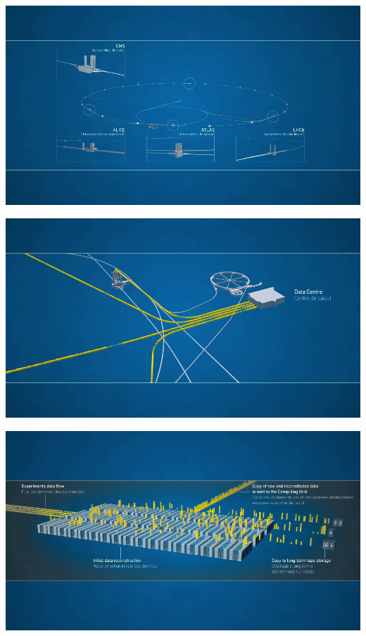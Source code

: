 \documentclass{beamer}
\begin{document}
\begin{frame}
    \includegraphics[width=\textwidth]{video/detectors.png}
\end{frame}

\begin{frame}
    \includegraphics[width=\textwidth]{video/data_center.png}
\end{frame}

\begin{frame}
    \includegraphics[width=\textwidth]{video/processing.png}
\end{frame}
\end{document}
